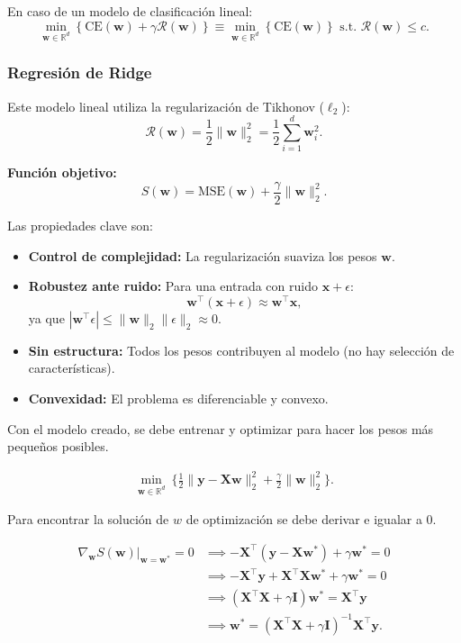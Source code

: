 En caso de un modelo de clasificación lineal:
$$
\min_{\mathbf{w}\in\mathbb{R}^{d}} \left\{\mathrm{CE}(\mathbf{w}) + \gamma\mathcal{R}(\mathbf{w})\right\} \equiv \min_{\mathbf{w}\in\mathbb{R}^{d}} \left\{\mathrm{CE}(\mathbf{w})\right\} \text{ s.t. } \mathcal{R}(\mathbf{w}) \leq c.
$$

\subsubsection{Regresión de Ridge}
Este modelo lineal utiliza la regularización de Tikhonov ($\ell_2$):
$$
\mathcal{R}(\mathbf{w}) = \frac{1}{2} \|\mathbf{w}\|_2^2 = \frac{1}{2} \sum_{i=1}^d \mathbf{w}_i^2.
$$

\textbf{Función objetivo:}
$$
S(\mathbf{w}) = \text{MSE}(\mathbf{w}) + \frac{\gamma}{2} \|\mathbf{w}\|_2^2.
$$

Las propiedades clave son:
\begin{itemize}
    \item \textbf{Control de complejidad:} La regularización suaviza los pesos $\mathbf{w}$.
    \item \textbf{Robustez ante ruido:} Para una entrada con ruido $\mathbf{x} + \epsilon$:
    $$ \mathbf{w}^\top (\mathbf{x} + \epsilon) \approx \mathbf{w}^\top \mathbf{x}, $$
    ya que $|\mathbf{w}^\top \epsilon| \leq \|\mathbf{w}\|_2 \|\epsilon\|_2 \approx 0$.
    \item \textbf{Sin estructura:} Todos los pesos contribuyen al modelo (no hay selección de características).
    \item \textbf{Convexidad:} El problema es diferenciable y convexo.
\end{itemize}

Con el modelo creado, se debe entrenar y optimizar para hacer los pesos más pequeños posibles.

\begin{align*}
\min_{\mathbf{w} \in \mathbb{R}^d}~\bigg\{\frac{1}{2}\|\mathbf{y}-\mathbf{X}\mathbf{w}\|_2^2 + \frac{\gamma}{2}\|\mathbf{w}\|_2^2\bigg\}.
\end{align*}

Para encontrar la solución de $w$ de optimización se debe derivar e igualar a 0.

\begin{align*}
\nabla_\mathbf{w}S(\mathbf{w})|_{\mathbf{w}=\mathbf{w}^*}=0 
&\implies -\mathbf{X}^{\intercal}(\mathbf{y}-\mathbf{X}\mathbf{w}^*)+\gamma\mathbf{w}^*=0 \\
&\implies -\mathbf{X}^{\intercal}\mathbf{y}+\mathbf{X}^{\intercal}\mathbf{X}\mathbf{w}^*+\gamma\mathbf{w}^*=0 \\
&\implies (\mathbf{X}^{\intercal}\mathbf{X}+\gamma\mathbf{I})\mathbf{w}^*=\mathbf{X}^{\intercal}\mathbf{y} \\
&\implies \boxed{\mathbf{w}^*=(\mathbf{X}^{\intercal}\mathbf{X}+\gamma\mathbf{I})^{-1}\mathbf{X}^{\intercal}\mathbf{y}}.
\end{align*}

